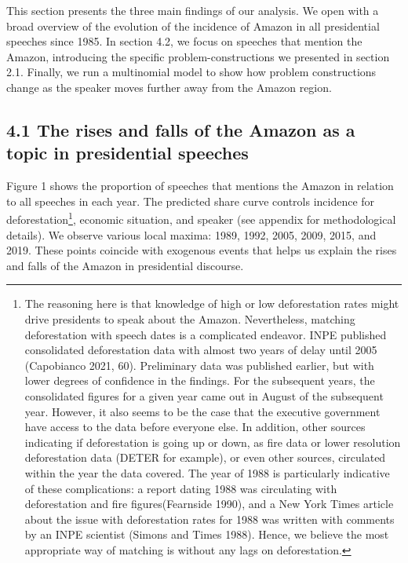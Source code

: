 \documentclass[
]{article}
\begin{document}
This section presents the three main findings of our analysis. We open
with a broad overview of the evolution of the incidence of Amazon in all
presidential speeches since 1985. In section 4.2, we focus on speeches
that mention the Amazon, introducing the specific problem-constructions
we presented in section 2.1. Finally, we run a multinomial model to show
how problem constructions change as the speaker moves further away from
the Amazon region.

\hypertarget{the-rises-and-falls-of-the-amazon-as-a-topic-in-presidential-speeches}{%
\subsection{4.1 The rises and falls of the Amazon as a topic in
presidential
speeches}\label{the-rises-and-falls-of-the-amazon-as-a-topic-in-presidential-speeches}}

Figure 1 shows the proportion of speeches that mentions the Amazon in
relation to all speeches in each year. The predicted share curve
controls incidence for deforestation\footnote{The reasoning here is that
  knowledge of high or low deforestation rates might drive presidents to
  speak about the Amazon. Nevertheless, matching deforestation with
  speech dates is a complicated endeavor. INPE published consolidated
  deforestation data with almost two years of delay until 2005
  (Capobianco 2021, 60). Preliminary data was published earlier, but
  with lower degrees of confidence in the findings. For the subsequent
  years, the consolidated figures for a given year came out in August of
  the subsequent year. However, it also seems to be the case that the
  executive government have access to the data before everyone else. In
  addition, other sources indicating if deforestation is going up or
  down, as fire data or lower resolution deforestation data (DETER for
  example), or even other sources, circulated within the year the data
  covered. The year of 1988 is particularly indicative of these
  complications: a report dating 1988 was circulating with deforestation
  and fire figures(Fearnside 1990), and a New York Times article about
  the issue with deforestation rates for 1988 was written with comments
  by an INPE scientist (Simons and Times 1988). Hence, we believe the
  most appropriate way of matching is without any lags on deforestation.},
economic situation, and speaker (see appendix for methodological
details). We observe various local maxima: 1989, 1992, 2005, 2009, 2015,
and 2019. These points coincide with exogenous events that helps us
explain the rises and falls of the Amazon in presidential discourse.
\end{document}
